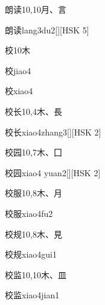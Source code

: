 \begin{Entry}{朗读}{10,10}{⽉、⾔}
  \begin{Phonetics}{朗读}{lang3du2}[][HSK 5]
  \end{Phonetics}
\end{Entry}

\begin{Entry}{校}{10}{⽊}
  \begin{Phonetics}{校}{jiao4}
  \end{Phonetics}
  \begin{Phonetics}{校}{xiao4}
  \end{Phonetics}
\end{Entry}

\begin{Entry}{校长}{10,4}{⽊、⾧}
  \begin{Phonetics}{校长}{xiao4zhang3}[][HSK 2]
  \end{Phonetics}
\end{Entry}

\begin{Entry}{校园}{10,7}{⽊、⼞}
  \begin{Phonetics}{校园}{xiao4 yuan2}[][HSK 2]
  \end{Phonetics}
\end{Entry}

\begin{Entry}{校服}{10,8}{⽊、⽉}
  \begin{Phonetics}{校服}{xiao4fu2}
  \end{Phonetics}
\end{Entry}

\begin{Entry}{校规}{10,8}{⽊、⾒}
  \begin{Phonetics}{校规}{xiao4gui1}
  \end{Phonetics}
\end{Entry}

\begin{Entry}{校监}{10,10}{⽊、⽫}
  \begin{Phonetics}{校监}{xiao4jian1}
  \end{Phonetics}
\end{Entry}

